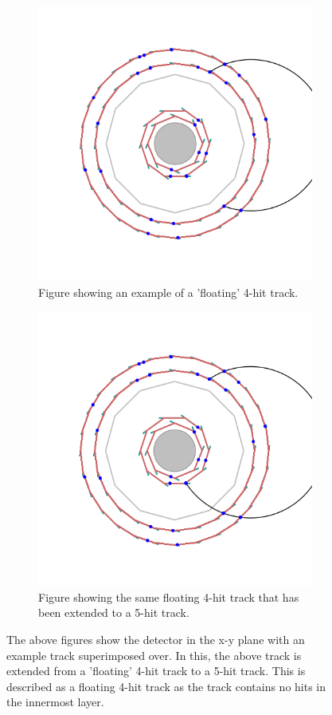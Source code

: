 \begin{figure}
    \centering
    \begin{subfigure}{.5\textwidth}
      \centering
      \includegraphics[width=.75\linewidth]{fig/tracking/s4.png}
      \caption{Figure showing an example of a 'floating' 4-hit track.}
      \label{fig:s4}
    \end{subfigure}%
    \begin{subfigure}{.5\textwidth}
      \centering
      \includegraphics[width=.75\linewidth]{fig/tracking/s5.png}
      \caption{Figure showing the same floating 4-hit track that has been extended to a 5-hit track.}
      \label{fig:s5}
    \end{subfigure}
    \caption{The above figures show the detector in the x-y plane with an example track superimposed over. 
    In this, the above track is extended from a 'floating' 4-hit track to a 5-hit track. This is described as a floating 4-hit track as the track contains no hits in the innermost layer.}
    \label{fig:4_5}
\end{figure}
